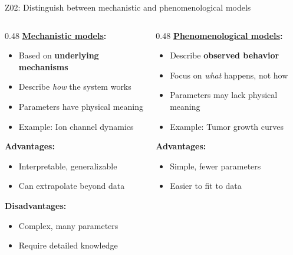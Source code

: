 \documentclass[aspectratio=169, 10pt]{beamer}
\begin{document}
\begin{frame}{Z02: Distinguish between mechanistic and phenomenological models}
    \begin{columns}[T]
        \begin{column}{0.48\textwidth}
            \textbf{\href{https://en.wikipedia.org/wiki/Mechanistic_model}{Mechanistic models}:}
            \begin{itemize}
                \item Based on \textbf{underlying mechanisms}
                \item Describe \textit{how} the system works
                \item Parameters have physical meaning
                \item Example: Ion channel dynamics
            \end{itemize}
            
            \vspace{0.3cm}
            \textbf{Advantages:}
            \begin{itemize}
                \item Interpretable, generalizable
                \item Can extrapolate beyond data
            \end{itemize}
            
            \textbf{Disadvantages:}
            \begin{itemize}
                \item Complex, many parameters
                \item Require detailed knowledge
            \end{itemize}
        \end{column}
        \begin{column}{0.48\textwidth}
            \textbf{\href{https://en.wikipedia.org/wiki/Phenomenological_model}{Phenomenological models}:}
            \begin{itemize}
                \item Describe \textbf{observed behavior}
                \item Focus on \textit{what} happens, not how
                \item Parameters may lack physical meaning
                \item Example: Tumor growth curves
            \end{itemize}
            
            \vspace{0.3cm}
            \textbf{Advantages:}
            \begin{itemize}
                \item Simple, fewer parameters
                \item Easier to fit to data
            \end{itemize}
            

\end{column}
\end{columns}
\end{frame}
\end{document}
